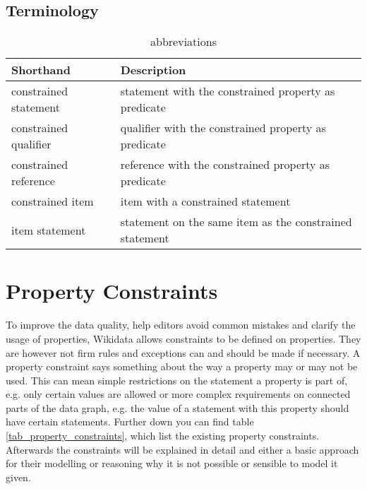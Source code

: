 \documentclass[hyperref,bachelorofscience,fleqn]{cgvpub}
\begin{document}
\section{Terminology}
\begin{table}[H]
\caption{abbreviations}
\begin{tabular}{ll}
Shorthand & Description \\
\hline
constrained statement & statement with the constrained property as predicate \\
constrained qualifier & qualifier with the constrained property as predicate \\
constrained reference & reference with the constrained property as predicate \\
constrained item & item with a constrained statement \\
item statement & statement on the same item as the constrained statement \\
\end{tabular}
\end{table}
\chapter{Property Constraints}

To improve the data quality, help editors avoid common mistakes and clarify the usage of properties, Wikidata allows constraints to be defined on properties. They are however not firm rules and exceptions can and should be made if necessary. A property constraint says something about the way a property may or may not be used. This can mean simple restrictions on the statement a property is part of, e.g. only certain values are allowed or more complex requirements on connected parts of the data graph, e.g. the value of a statement with this property should have certain statements. Further down you can find table \ref{tab_property_constraints}, which list the existing property constraints. Afterwards the constraints will be explained in detail and either a basic approach for their modelling or reasoning why it is not possible or sensible to model it given.\\
\end{document}
